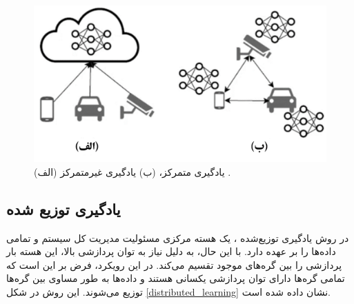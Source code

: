 \begin{figure}[b]
	\centering
	\includegraphics[scale=0.8]{images/chap1/centralized_decentralized_learning.png}%
	\caption{%
		(الف) یادگیری متمرکز، (ب) یادگیری غیرمتمرکز
		\cite{zhou2019edge}%
		.
	}
	\label{centralized_decentralized_learning}
	\centering
\end{figure}


\subsection{یادگیری توزیع شده}
در روش یادگیری توزیع‌شده%
، یک هسته مرکزی مسئولیت مدیریت کل سیستم و تمامی داده‌ها را بر عهده دارد. با این حال، به دلیل نیاز به توان پردازشی بالا، این هسته بار پردازشی را بین گره‌های موجود تقسیم می‌کند. در این رویکرد، فرض بر این است که تمامی گره‌ها دارای توان پردازشی یکسانی هستند و داده‌ها به طور مساوی بین گره‌ها توزیع می‌شوند. این روش در شکل
\ref{distributed_learning}
نشان داده شده است.


